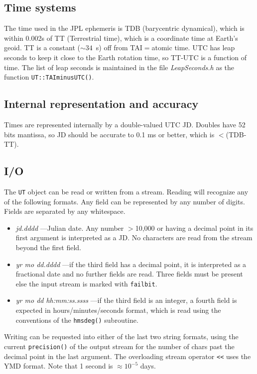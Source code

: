 \documentclass[11pt,preprint,flushrt]{aastex}
\begin{document}
\subsection{Time systems}
The time used in the JPL ephemeris is TDB (barycentric dynamical), which
is within 0.002s of TT (Terrestrial time), which is a coordinate time at
Earth's geoid.  TT is a constant ($\sim34$~s) off from TAI$=$atomic time.
UTC has leap seconds to keep it close to the Earth rotation time, so
TT-UTC is a function of time. The list of leap seconds is maintained
in the file {\it LeapSeconds.h} as the function {\tt UT::TAIminusUTC()}.


\subsection{Internal representation and accuracy}
Times are represented internally by a double-valued UTC JD.  Doubles
 have 52 bits mantissa, so JD should be accurate to 0.1 ms or better, which is $<$(TDB-TT).

\subsection{I/O}
The \texttt{UT} object can be read or written from a stream.  Reading will recognize any of the following formats.  Any field can be represented by any number of digits.  Fields are separated by any whitespace.
\begin{itemize}
\item {\it jd.dddd} ---Julian date.  Any number $>$10,000 or having a decimal point in its first argument is interpreted as a JD.  No characters are read from the stream beyond the first field.
\item{\it yr mo dd.dddd} ---if the third field has a decimal point, it is interpreted as a fractional date and no further fields are read.  Three fields must be present else the input stream is marked with {\tt failbit}.
\item{\it yr mo dd hh:mm:ss.ssss} ---if the third field is an integer, a fourth field is expected in hours/minutes/seconds format, which is read using the conventions of the {\tt hmsdeg()} subroutine.
\end{itemize}
Writing can be requested into either of the last two string formats, using the current {\tt precision()} of the output stream for the number of chars past the decimal point in the last argument.  The overloading stream operator {\tt <<} uses the YMD format.  Note that 1 second is $\approx10^{-5}$ days.
\end{document}
